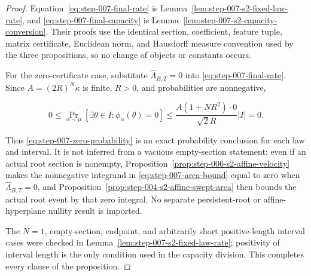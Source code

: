 \begin{proof}
Equation~\eqref{eq:step-007-final-rate} is
Lemma~\ref{lem:step-007-s2-fixed-law-rate}, and
\eqref{eq:step-007-final-capacity} is
Lemma~\ref{lem:step-007-s2-capacity-conversion}. Their proofs use the identical section, coefficient,
feature tuple, matrix certificate, Euclidean norm, and Hausdorff measure convention used by the three
propositions, so no change of objects or constants occurs.

For the zero-certificate case, substitute \(\widehat\Lambda_{B,T}=0\) into
\eqref{eq:step-007-final-rate}. Since
\(A=(2R)^N\kappa\) is finite, \(R>0\), and probabilities are nonnegative,

\begin{equation}
0
\leq
\Pr_{\alpha\sim\mu}[\exists\theta\in I:\phi_\alpha(\theta)=0]
\leq
\frac{A(1+NR^2)\cdot0}{\sqrt2R}\lvert I\rvert
=0.
\label{eq:step-007-zero-chain}
\end{equation}

Thus \eqref{eq:step-007-zero-probability} is an exact probability conclusion
for each law and interval. It is not inferred from a vacuous empty-section
statement: even if an actual root section is nonempty,
Proposition~\ref{prop:step-006-s2-affine-velocity} makes the nonnegative
integrand in \eqref{eq:step-007-area-bound} equal to zero when
\(\widehat\Lambda_{B,T}=0\), and Proposition~\ref{prop:step-004-s2-affine-swept-area} then bounds the actual root event by that zero integral.
No separate persistent-root or affine-hyperplane nullity result is imported.

The \(N=1\), empty-section, endpoint, and arbitrarily short positive-length interval cases were checked in
Lemma~\ref{lem:step-007-s2-fixed-law-rate}; positivity of interval length is the only condition used in the
capacity division. This completes every clause of the proposition. 
\end{proof}


